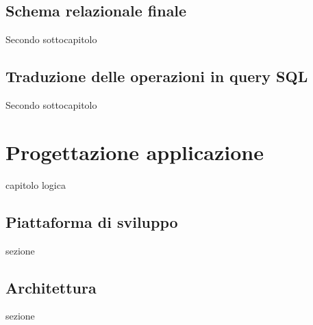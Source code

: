 ﻿\documentclass[a4paper,12pt]{report}
\begin{document}
\section{Schema relazionale finale}
Secondo sottocapitolo
\section{Traduzione delle operazioni in query SQL}
Secondo sottocapitolo


\chapter{Progettazione applicazione}
capitolo logica
\section{Piattaforma di sviluppo}
sezione
\section{Architettura}
sezione
\end{document}
